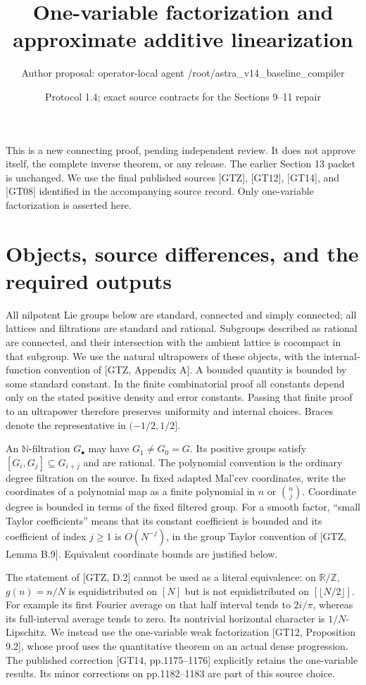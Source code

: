 \documentclass[11pt]{article}
\title{One-variable factorization and approximate additive linearization}
\author{Author proposal: operator-local agent /root/astra\_v14\_baseline\_compiler}
\date{Protocol 1.4; exact source contracts for the Sections 9--11 repair}
\newcommand{\Z}{\mathbb Z}
\newcommand{\R}{\mathbb R}
\begin{document}
\maketitle
\noindent This is a new connecting proof, pending independent review. It does not
approve itself, the complete inverse theorem, or any release. The earlier
Section 13 packet is unchanged. We use the final published sources [GTZ],
[GT12], [GT14], and [GT08] identified in the accompanying source record.
Only one-variable factorization is asserted here.

\section{Objects, source differences, and the required outputs}
All nilpotent Lie groups below are standard, connected and simply connected;
all lattices and filtrations are standard and rational. Subgroups described as
rational are connected, and their intersection with the ambient lattice is
cocompact in that subgroup. We use the natural ultrapowers of these objects,
with the internal-function convention of [GTZ, Appendix A]. A bounded quantity
is bounded by some standard constant. In the finite combinatorial proof all
constants depend only on the stated positive density and error constants.
Passing that finite proof to an ultrapower therefore preserves uniformity and
internal choices. Braces denote the representative in $(-1/2,1/2]$.

An $\mathbb N$-filtration $G_\bullet$ may have $G_1\ne G_0=G$.
Its positive groups satisfy $[G_i,G_j]\subseteq G_{i+j}$ and are rational.
The polynomial convention is the ordinary degree filtration on the source.
In fixed adapted Mal'cev coordinates, write the coordinates of a polynomial
map as a finite polynomial in $n$ or $\binom n j$. Coordinate degree is bounded
in terms of the fixed filtered group. For a smooth factor, ``small Taylor
coefficients'' means that its constant coefficient is bounded and its
coefficient of index $j\geq1$ is $O(N^{-j})$, in the group Taylor convention
of [GTZ, Lemma B.9]. Equivalent coordinate bounds are justified below.

The statement of [GTZ, D.2] cannot be used as a literal equivalence: on
$\R/\Z$, $g(n)=n/N$ is equidistributed on $[N]$ but is not equidistributed
on $[\lfloor N/2\rfloor]$. For example its first Fourier average on that
half interval tends to $2i/\pi$, whereas its full-interval average tends to
zero. Its nontrivial horizontal character is $1/N$-Lipschitz. We instead use
the one-variable weak factorization [GT12, Proposition 9.2], whose proof uses
the quantitative theorem on an actual dense progression. The published
correction [GT14, pp.1175--1176] explicitly retains the one-variable results.
Its minor corrections on pp.1182--1183 are part of this source choice.
\end{document}
